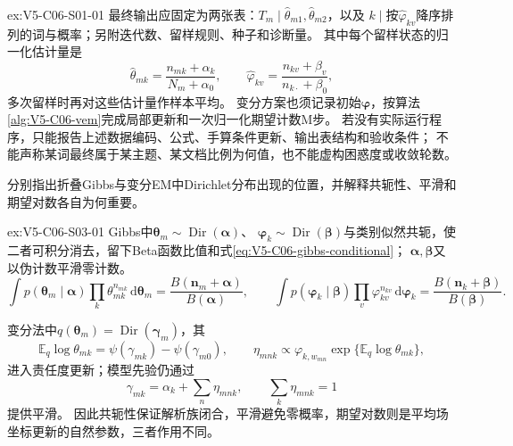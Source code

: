 \begin{SLChapterExercisePairSection}
\begin{chapterexercisesolution}{ex:V5-C06-S01-01}
最终输出应固定为两张表：$T_m\mid\widehat\theta_{m1},\widehat\theta_{m2}$，以及
$k\mid$按$\widehat\varphi_{kv}$降序排列的词与概率；另附迭代数、留样规则、种子和诊断量。
其中每个留样状态的归一化估计量是
\[
\widehat\theta_{mk}
=\frac{n_{mk}+\alpha_k}{N_m+\alpha_0},\qquad
\widehat\varphi_{kv}
=\frac{n_{kv}+\beta_v}{n_{k\cdot}+\beta_0},
\]
多次留样时再对这些估计量作样本平均。
变分方案也须记录初始$\boldsymbol\varphi$，按算法\ref{alg:V5-C06-vem}完成局部更新和一次归一化期望计数M步。
若没有实际运行程序，只能报告上述数据编码、公式、手算条件更新、输出表结构和验收条件；
不能声称某词最终属于某主题、某文档比例为何值，也不能虚构困惑度或收敛轮数。
\end{chapterexercisesolution}
\fi

\begin{exercise}\label{ex:V5-C06-S03-01}
分别指出折叠Gibbs与变分EM中Dirichlet分布出现的位置，并解释共轭性、平滑和期望对数各自为何重要。
\end{exercise}
\ifSLFullEdition
{}\label{sol:V5-C06-S03-01}
\begin{chapterexercisesolution}{ex:V5-C06-S03-01}
\nopagebreak[4]
Gibbs中$\boldsymbol\theta_m\sim\operatorname{Dir}(\boldsymbol\alpha)$、
$\boldsymbol\varphi_k\sim\operatorname{Dir}(\boldsymbol\beta)$与类别似然共轭，使二者可积分消去，留下Beta函数比值和式\eqref{eq:V5-C06-gibbs-conditional}；
$\boldsymbol\alpha,\boldsymbol\beta$又以伪计数平滑零计数。
\[
\int p(\boldsymbol\theta_m\mid\boldsymbol\alpha)
\prod_k\theta_{mk}^{n_{mk}}\,\mathrm d\boldsymbol\theta_m
=\frac{B(\boldsymbol n_m+\boldsymbol\alpha)}{B(\boldsymbol\alpha)},\qquad
\int p(\boldsymbol\varphi_k\mid\boldsymbol\beta)
\prod_v\varphi_{kv}^{n_{kv}}\,\mathrm d\boldsymbol\varphi_k
=\frac{B(\boldsymbol n_k+\boldsymbol\beta)}{B(\boldsymbol\beta)}.
\]

变分法中$q(\boldsymbol\theta_m)=\operatorname{Dir}(\boldsymbol\gamma_m)$，其
\[
\mathbb E_q\log\theta_{mk}
=\psi(\gamma_{mk})-\psi(\gamma_{m0}),\qquad
\eta_{mnk}\propto
\varphi_{k,w_{mn}}\exp\{\mathbb E_q\log\theta_{mk}\},
\]
进入责任度更新；模型先验仍通过
\[
\gamma_{mk}=\alpha_k+\sum_n\eta_{mnk},\qquad
\sum_k\eta_{mnk}=1
\]
提供平滑。
因此共轭性保证解析族闭合，平滑避免零概率，期望对数则是平均场坐标更新的自然参数，三者作用不同。
\end{chapterexercisesolution}
\fi


\end{SLChapterExercisePairSection}
